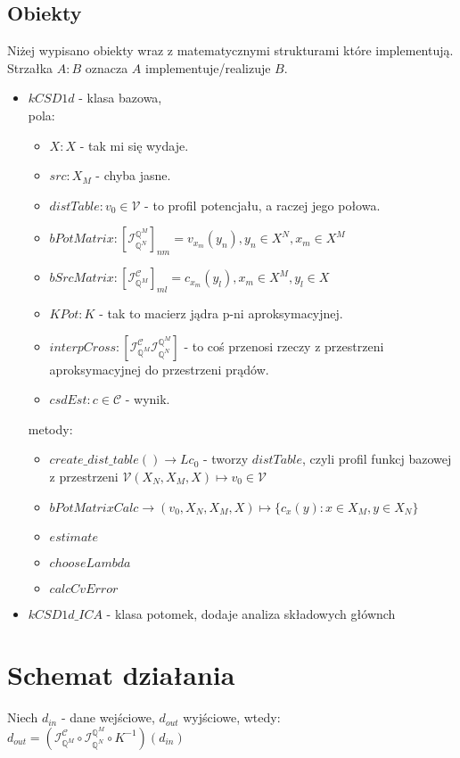 \documentclass[9pt]{article}
\newcommand{\Q}{\mathbb{Q}}
\newcommand{\V}{\mathcal{V}}
\newcommand{\C}{\mathcal{C}}
\newcommand{\IC}{ \mathcal{I}_{\Q^M}^{\C}}
\newcommand{\IV}{ \mathcal{I}_{\Q^N}^{\Q^M}}
\begin{document}
\subsection{Obiekty}
Niżej wypisano obiekty wraz z matematycznymi strukturami które implementują.
Strzałka $A : B $ oznacza $A$ implementuje/realizuje $B$.
\begin{itemize}
    \item $kCSD1d$ -  klasa bazowa, \\
    pola:
    \begin{itemize}
        \item $X : X$ -  tak mi się wydaje.
        \item $src : X_M$ - chyba jasne.
        \item $distTable : v_0 \in \V$ - to profil potencjału, a raczej jego połowa.
        \item $bPotMatrix : [\IV]_{nm} = v_{x_m}(y_n), y_n\in X^N, x_m\in X^M$
        \item $bSrcMatrix : [\IC]_{ml} = c_{x_m}(y_l), x_m\in X^M, y_l\in X$ 
        \item $KPot : K$ - tak to macierz jądra p-ni aproksymacyjnej.
        \item $interpCross :[\IC \IV] $ - to coś przenosi rzeczy z przestrzeni
        aproksymacyjnej do przestrzeni prądów.
        \item $csdEst: c \in \C$ - wynik.
    \end{itemize}
    metody:
    \begin{itemize}
        \item $create\_dist\_table() \to  Lc_0$ - tworzy $distTable$, czyli profil funkcj 
        bazowej z przestrzeni $\V (X_N,X_M,X) \mapsto v_0 \in \V$
        \item $bPotMatrixCalc \to (v_0, X_N,X_M,X)\mapsto \{c_x(y):x\in X_M, y\in X_N \}$ 
        \item $estimate$
        \item $chooseLambda$
        \item $calcCvError$
    \end{itemize}
    \item $kCSD1d\_ICA$ - klasa potomek, dodaje analiza składowych głównch
\end{itemize}

\section{Schemat działania}
Niech $d_{in}$ - dane wejściowe, $d_{out}$ wyjściowe, wtedy:
$d_{out}= (\IC \circ \IV \circ K^{-1} )( d_{in})$
\end{document}
